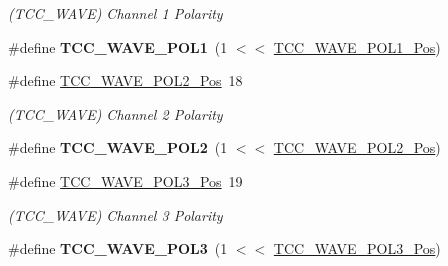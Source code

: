 \begin{DoxyCompactItemize}
\begin{DoxyCompactList}\small\item\em (T\+C\+C\+\_\+\+W\+A\+V\+E) Channel 1 Polarity \end{DoxyCompactList}\item 
\hypertarget{group___s_a_m_l21___t_c_c_ga79f2e45539518374211030ed9a7044b1}{}\#define {\bfseries T\+C\+C\+\_\+\+W\+A\+V\+E\+\_\+\+P\+O\+L1}~(1 $<$$<$ \hyperlink{group___s_a_m_l21___t_c_c_ga832bcc3f5775bc3f720ad9d15fbab73e}{T\+C\+C\+\_\+\+W\+A\+V\+E\+\_\+\+P\+O\+L1\+\_\+\+Pos})\label{group___s_a_m_l21___t_c_c_ga79f2e45539518374211030ed9a7044b1}

\item 
\hypertarget{group___s_a_m_l21___t_c_c_gabc9a8e0ad4a119e26d412e7dd7855016}{}\#define \hyperlink{group___s_a_m_l21___t_c_c_gabc9a8e0ad4a119e26d412e7dd7855016}{T\+C\+C\+\_\+\+W\+A\+V\+E\+\_\+\+P\+O\+L2\+\_\+\+Pos}~18\label{group___s_a_m_l21___t_c_c_gabc9a8e0ad4a119e26d412e7dd7855016}

\begin{DoxyCompactList}\small\item\em (T\+C\+C\+\_\+\+W\+A\+V\+E) Channel 2 Polarity \end{DoxyCompactList}\item 
\hypertarget{group___s_a_m_l21___t_c_c_ga3b0ae05d88241a2363ddb67df7a4bc0a}{}\#define {\bfseries T\+C\+C\+\_\+\+W\+A\+V\+E\+\_\+\+P\+O\+L2}~(1 $<$$<$ \hyperlink{group___s_a_m_l21___t_c_c_gabc9a8e0ad4a119e26d412e7dd7855016}{T\+C\+C\+\_\+\+W\+A\+V\+E\+\_\+\+P\+O\+L2\+\_\+\+Pos})\label{group___s_a_m_l21___t_c_c_ga3b0ae05d88241a2363ddb67df7a4bc0a}

\item 
\hypertarget{group___s_a_m_l21___t_c_c_ga47dc2014fa8a174daf29852007786977}{}\#define \hyperlink{group___s_a_m_l21___t_c_c_ga47dc2014fa8a174daf29852007786977}{T\+C\+C\+\_\+\+W\+A\+V\+E\+\_\+\+P\+O\+L3\+\_\+\+Pos}~19\label{group___s_a_m_l21___t_c_c_ga47dc2014fa8a174daf29852007786977}

\begin{DoxyCompactList}\small\item\em (T\+C\+C\+\_\+\+W\+A\+V\+E) Channel 3 Polarity \end{DoxyCompactList}\item 
\hypertarget{group___s_a_m_l21___t_c_c_ga6072d8224eae373ff630359ed98ec0e5}{}\#define {\bfseries T\+C\+C\+\_\+\+W\+A\+V\+E\+\_\+\+P\+O\+L3}~(1 $<$$<$ \hyperlink{group___s_a_m_l21___t_c_c_ga47dc2014fa8a174daf29852007786977}{T\+C\+C\+\_\+\+W\+A\+V\+E\+\_\+\+P\+O\+L3\+\_\+\+Pos})\label{group___s_a_m_l21___t_c_c_ga6072d8224eae373ff630359ed98ec0e5}


\end{DoxyCompactItemize}
